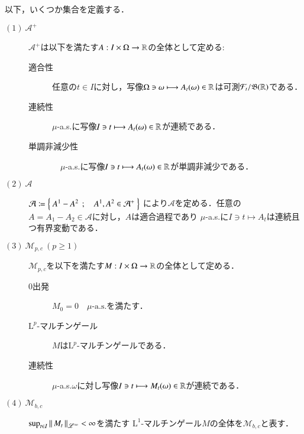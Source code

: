 	以下，いくつか集合を定義する．
	\begin{description}
		\item[$\mathrm{(1)}\ \mathcal{A}^+$] 
			$\mathcal{A}^+$は以下を満たす$A:I \times \Omega \rightarrow \mathbb{R}$の全体として定める:
			\begin{description}
				\item[適合性] 任意の$t \in I$に対し，写像$\Omega \ni \omega \longmapsto A_t(\omega) \in \mathbb{R}$は可測$\mathcal{F}_t/\mathfrak{B}(\mathbb{R})$である．
				\item[連続性] $\mu$-a.s.に写像$I \ni t \longmapsto A_t(\omega) \in \mathbb{R}$が連続である．
				\item[単調非減少性]　$\mu$-a.s.に写像$I \ni t \longmapsto A_t(\omega) \in \mathbb{R}$が単調非減少である．
			\end{description}
		
		\item[$\mathrm{(2)}\ \mathcal{A}$]
			$\mathcal{A} \coloneqq \left\{\ A^1 - A^2\ \, ; \quad A^1,A^2 \in \mathcal{A}^+\ \right\}$
			により$\mathcal{A}$を定める．任意の$A = A_1 - A_2 \in \mathcal{A}$に対し，$A$は適合過程であり
			$\mu$-a.s.に$I \ni t \longmapsto A_t$は連続且つ有界変動である．
			
		\item[$\mathrm{(3)}\ \mathcal{M}_{p,c}\ (p \geq 1)$]
			$\mathcal{M}_{p,c}$を以下を満たす$M:I \times \Omega \rightarrow \mathbb{R}$の全体として定める．
			\begin{description}
				\item[0出発] $M_0 = 0 \quad \mbox{$\mu$-a.s.}$を満たす．
				\item[$\mathrm{L}^p$-マルチンゲール] $M$は$\mathrm{L}^p$-マルチンゲールである．
				\item[連続性] $\mu$-a.s.$\omega$に対し写像$I \ni t \longmapsto M_t(\omega) \in \mathbb{R}$が連続である．
			\end{description}
		
		\item[$\mathrm{(4)}\ \mathcal{M}_{b,c}$]
			$\operatorname*{sup}_{t \in I} \left\|\, M_t\, \right\|_{\mathscr{L}^\infty} < \infty$を満たす
			$\mathrm{L}^1$-マルチンゲール$M$の全体を$\mathcal{M}_{b,c}$と表す．
			

\end{description}
